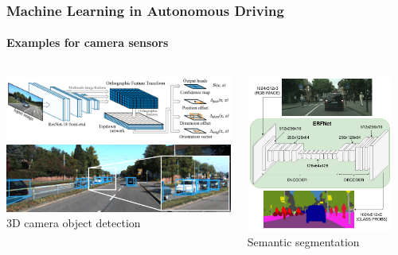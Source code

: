{\begin{frame}
\frametitle{Machine Learning in Autonomous Driving}
\framesubtitle{Examples for camera sensors}
\begin{columns}[]
    \begin{column}{0.6\textwidth}
        \centering
        \includegraphics[width=\textwidth]{images/roddick_3d_camera_network.png}\\
        \includegraphics[width=\textwidth]{images/roddick_3d_camera_detections.png}\\
        \vspace{0.1cm}
        \footnotesize{3D camera object detection \cite{Roddick2019}}
    \end{column}
    \begin{column}{0.4\textwidth}
        \centering
        \includegraphics[width=0.9\textwidth]{images/erfnet_semantic_segmentation.png}\\
        \footnotesize{Semantic segmentation \cite{Romera2018}}
    \end{column}
\end{columns}
\end{frame}

}
